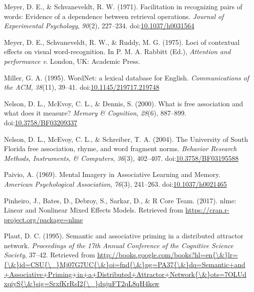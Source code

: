\documentclass[english,man]{apa6}
\theoremstyle{definition}
\theoremstyle{definition}
\theoremstyle{definition}
\theoremstyle{remark}
\begin{document}
\hypertarget{ref-Meyer1971}{}
Meyer, D. E., \& Schvaneveldt, R. W. (1971). Facilitation in recognizing
pairs of words: Evidence of a dependence between retrieval operations.
\emph{Journal of Experimental Psychology}, \emph{90}(2), 227--234.
doi:\href{https://doi.org/10.1037/h0031564}{10.1037/h0031564}

\hypertarget{ref-Meyer1975}{}
Meyer, D. E., Schvaneveldt, R. W., \& Ruddy, M. G. (1975). Loci of
contextual effects on visual word-recognition. In P. M. A. Rabbitt
(Ed.), \emph{Attention and performance v}. London, UK: Academic Press.

\hypertarget{ref-Miller1995}{}
Miller, G. A. (1995). WordNet: a lexical database for English.
\emph{Communications of the ACM}, \emph{38}(11), 39--41.
doi:\href{https://doi.org/10.1145/219717.219748}{10.1145/219717.219748}

\hypertarget{ref-Nelson2000}{}
Nelson, D. L., McEvoy, C. L., \& Dennis, S. (2000). What is free
association and what does it measure? \emph{Memory \& Cognition},
\emph{28}(6), 887--899.
doi:\href{https://doi.org/10.3758/BF03209337}{10.3758/BF03209337}

\hypertarget{ref-Nelson2004}{}
Nelson, D. L., McEvoy, C. L., \& Schreiber, T. A. (2004). The University
of South Florida free association, rhyme, and word fragment norms.
\emph{Behavior Research Methods, Instruments, \& Computers},
\emph{36}(3), 402--407.
doi:\href{https://doi.org/10.3758/BF03195588}{10.3758/BF03195588}

\hypertarget{ref-Paivio1969}{}
Paivio, A. (1969). Mental Imagery in Associative Learning and Memory.
\emph{American Psychological Association}, \emph{76}(3), 241--263.
doi:\href{https://doi.org/10.1037/h0021465}{10.1037/h0021465}

\hypertarget{ref-Pinheiro2017}{}
Pinheiro, J., Bates, D., Debroy, S., Sarkar, D., \& R Core Team. (2017).
nlme: Linear and Nonlinear Mixed Effects Models. Retrieved from
\url{https://cran.r-project.org/package=nlme}

\hypertarget{ref-Plaut1995}{}
Plaut, D. C. (1995). Semantic and associative priming in a distributed
attractor network. \emph{Proceedings of the 17th Annual Conference of
the Cognitive Science Society}, 37--42. Retrieved from
\href{http://books.google.com/books?hl=en\%7B/\&\%7Dlr=\%7B/\&\%7Did=CSU\%7B/_\%7DMj07G7UC\%7B/\&\%7Doi=fnd\%7B/\&\%7Dpg=PA37\%7B/\&\%7Ddq=Semantic+and+Associative+Priming+in+a+Distributed+Attractor+Network\%7B/\&\%7Dots=7OLUdxqiyS\%7B/\&\%7Dsig=SrxfKrRsI2\%7B/_\%7DdujuFT2qL8qH4ksw}{http://books.google.com/books?hl=en\{\textbackslash{}\&\}lr=\{\textbackslash{}\&\}id=CSU\{\textbackslash{}\_\}Mj07G7UC\{\textbackslash{}\&\}oi=fnd\{\textbackslash{}\&\}pg=PA37\{\textbackslash{}\&\}dq=Semantic+and+Associative+Priming+in+a+Distributed+Attractor+Network\{\textbackslash{}\&\}ots=7OLUdxqiyS\{\textbackslash{}\&\}sig=SrxfKrRsI2\{\textbackslash{}\_\}dujuFT2qL8qH4ksw}
\end{document}
